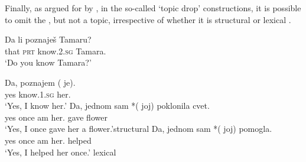 \documentclass[output=paper,modfonts,newtxmath,hidelinks]{langscibook}
\begin{document}
\noindent Finally, as argued for  by \citet{sternefeld85,bayeretal01,mcfadden04}, in the so-called `topic drop' constructions, it is possible to omit the \accc{} , but not a \datt{} topic, irrespective of whether it is structural  or lexical .

\ea\gll Da li poznaješ Tamaru?\\
that \textsc{prt} know.\textsc{2.sg} Tamara.\accc\\
\glt `Do you know Tamara?'
\z

\ea 
\ea\label{16:ex25a}\gll Da, poznajem (\hspace{-2pt} je).\\
yes know.\textsc{1.sg} {} her.\accc\\
\glt `Yes, I know her.'
\ex\label{16:ex25b}\gll Da, jednom sam *(\hspace{-2pt} joj) poklonila cvet.\\
yes once am {} her.\datt{} gave flower\\
\glt `Yes, I once gave her a flower.'\hfill structural \datt
\ex\label{16:ex25c}\gll Da, jednom sam *(\hspace{-2pt} joj) pomogla.\\
yes once am {} her.\datt{} helped\\
\glt `Yes, I helped her once.' \hfill lexical \datt 	
\z \z
\end{document}
